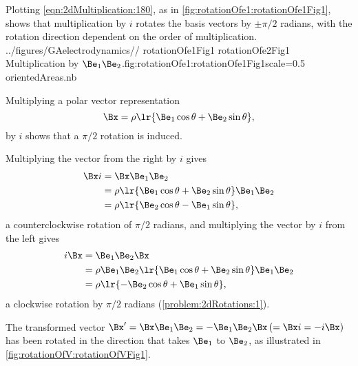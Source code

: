 %
%
Plotting \cref{eqn:2dMultiplication:180}, as in
\cref{fig:rotationOfe1:rotationOfe1Fig1},
 shows that multiplication by \( i \) rotates the  basis vectors by \( \pm \pi/2 \) radians,
with the
rotation direction dependent on the order of multiplication.
\pmathImageTwoFigures
{../figures/GAelectrodynamics/\subfigdir/}
{rotationOfe1Fig1}
{rotationOfe2Fig1}
{Multiplication by \( \Be_1 \Be_2 \).}{fig:rotationOfe1:rotationOfe1Fig1}{scale=0.5}
{orientedAreas.nb}

Multiplying a polar vector representation
\begin{equation}\label{eqn:2dRotations:280}
   \Bx = \rho \lr{ \Be_1 \cos\theta + \Be_2 \sin\theta },
\end{equation}
by \( i \) shows that a \( \pi/2 \) rotation is induced.

Multiplying the vector from the right by \( i \) gives
\begin{equation}\label{eqn:2dRotations:300}
\begin{aligned}
\Bx i
&= \Bx \Be_1 \Be_2 \\
&= \rho \lr{ \Be_1 \cos\theta + \Be_2 \sin\theta } \Be_1 \Be_2 \\
&= \rho \lr{ \Be_2 \cos\theta - \Be_1 \sin\theta },
\end{aligned}
\end{equation}
a counterclockwise rotation of \( \pi/2 \) radians, and
multiplying the vector by \( i \) from the left gives
\begin{equation}\label{eqn:2dRotations:3}
\begin{aligned}
i \Bx
&= \Be_1 \Be_2 \Bx \\
&= \rho \Be_1 \Be_2 \lr{ \Be_1 \cos\theta + \Be_2 \sin\theta } \Be_1 \Be_2 \\
&= \rho \lr{ -\Be_2 \cos\theta + \Be_1 \sin\theta },
\end{aligned}
\end{equation}
a clockwise rotation by \( \pi/2 \) radians
(\cref{problem:2dRotations:1}).

The transformed vector \( \Bx' = \Bx \Be_1 \Be_2 = -\Be_1 \Be_2 \Bx \,(= \Bx i = -i \Bx) \) has been rotated in the direction that takes \( \Be_1 \) to \( \Be_2 \), as illustrated
in \cref{fig:rotationOfV:rotationOfVFig1}.

